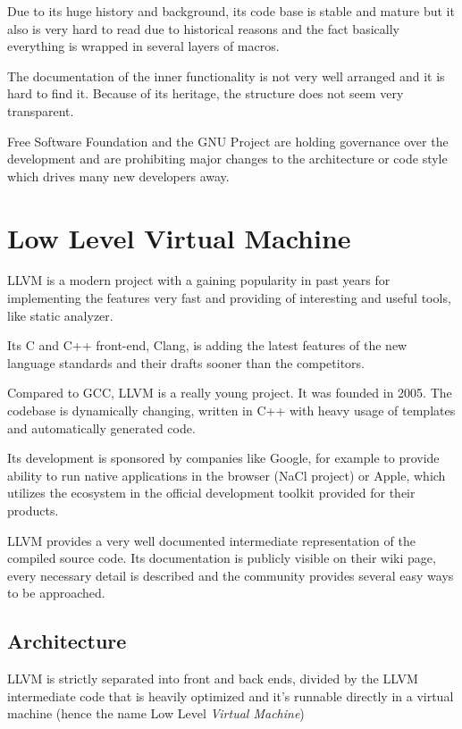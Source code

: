     Due to its huge history and background, its code base is stable and mature but it also is very hard to read due to historical reasons and the fact basically everything is wrapped in several layers of macros.

    The documentation of the inner functionality is not very well arranged and it is hard to find it. Because of its heritage, the structure does not seem very transparent.

    Free Software Foundation and the GNU Project are holding governance over the development and are prohibiting major changes to the architecture or code style which drives many new developers away.

    \section{Low Level Virtual Machine}

    LLVM is a modern project with a gaining popularity in past years for implementing the features very fast and providing of interesting and useful tools, like static analyzer.

    Its C and C++ front-end, Clang, is adding the latest features of the new language standards and their drafts sooner than the competitors.

    Compared to GCC, LLVM is a really young project. It was founded in 2005. The codebase is dynamically changing, written in C++ with heavy usage of templates and automatically generated code.

    Its development is sponsored by companies like Google, for example to provide ability to run native applications in the browser (NaCl project) or Apple, which utilizes the ecosystem in the official development toolkit provided for their products.

    LLVM provides a very well documented intermediate representation of the compiled source code. Its documentation is publicly visible on their wiki page, every necessary detail is described and the community provides several easy ways to be approached.

        \subsection{Architecture}

        LLVM is strictly separated into front and back ends, divided by the LLVM intermediate code that is heavily optimized and it's runnable directly in a virtual machine (hence the name Low Level \emph{Virtual Machine})

